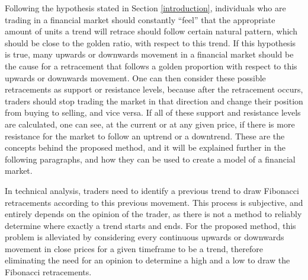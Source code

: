 \documentclass[letterpaper]{article}
\begin{document}
Following the hypothesis stated in Section \ref{introduction},
individuals who are trading in a financial market should constantly %
``feel'' that the appropriate amount of units a trend will retrace
should follow certain natural pattern, which should be close to the
golden ratio, with respect to this trend. 
If this hypothesis
is true, many upwards or downwards movement in a financial market %
should be the cause for a retracement that follows a golden
proportion with respect to this upwards or downwards movement. One can
then consider these possible retracements as support or resistance
levels, because after the retracement occurs, traders should stop
trading the market in that direction and change their position from
buying to selling, and vice versa. If all of these support and
resistance levels are calculated, one can see, at the current or at
any given price, if there is more resistance for the market to follow an
uptrend or a downtrend. These are the concepts behind the proposed
method, and it will be explained further in the following paragraphs,
and how they can be used to create a model of a financial market.

In technical analysis, traders need to identify a previous trend to 
% 
draw Fibonacci retracements according to this previous
movement. This process is subjective, and entirely depends on the
opinion of the trader, as there is not a method to reliably determine
where exactly a trend starts and ends. For the proposed method, this
problem is alleviated by considering every continuous upwards or
downwards movement in close prices for a given timeframe to be a
trend, therefore eliminating the need for an opinion to determine a
high and a low to draw the Fibonacci retracements. %
\end{document}
